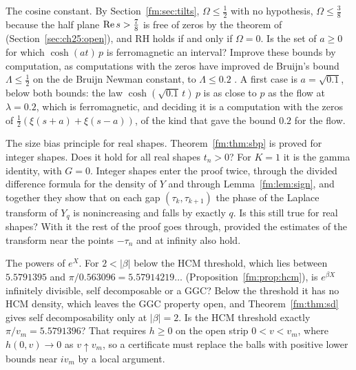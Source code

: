 \begin{problem}\label{fm:prob:omega}
The cosine constant. By Section~\ref{fm:sec:tilts}, $\Omega\le\frac12$ with no hypothesis, $\Omega\le\frac38$ because the half plane $\operatorname{Re} s>\frac78$ is free of zeros by the theorem of \cite{OAI26a} (Section~\ref{sec:ch25:open}), and RH holds if and only if $\Omega=0$. Is the set of $a\ge0$ for which $\cosh(at)\,p$ is ferromagnetic an interval? Improve these bounds by computation, as computations with the zeros have improved de Bruijn's bound $\Lambda\le\frac12$ on the de Bruijn Newman constant, to $\Lambda\le0.2$ \cite{PT21}. A first case is $a=\sqrt{0.1}$, below both bounds: the law $\cosh(\sqrt{0.1}\,t)\,p$ is as close to $p$ as the flow at $\lambda=0.2$, which is ferromagnetic, and deciding it is a computation with the zeros of $\frac12(\xi(s+a)+\xi(s-a))$, of the kind that gave the bound $0.2$ for the flow.
\end{problem}

\begin{problem}\label{fm:prob:sbp}
The size bias principle for real shapes. Theorem~\ref{fm:thm:sbp} is proved for integer shapes. Does it hold for all real shapes $t_n>0$? For $K=1$ it is the gamma identity, with $G=0$. Integer shapes enter the proof twice, through the divided difference formula for the density of $Y$ and through Lemma~\ref{fm:lem:sign}, and together they show that on each gap $(\tau_k,\tau_{k+1})$ the phase of the Laplace transform of $Y_q$ is nonincreasing and falls by exactly $q$. Is this still true for real shapes? With it the rest of the proof goes through, provided the estimates of the transform near the points $-\tau_n$ and at infinity also hold.
\end{problem}

\begin{problem}\label{fm:prob:powers}
The powers of $e^X$. For $2<|\beta|$ below the HCM threshold, which lies between $5.5791395$ and $\pi/0.563096=5.57914219\ldots$ (Proposition~\ref{fm:prop:hcm}), is $e^{\beta X}$ infinitely divisible, self decomposable or a GGC? Below the threshold it has no HCM density, which leaves the GGC property open, and Theorem~\ref{fm:thm:sd} gives self decomposability only at $|\beta|=2$. Is the HCM threshold exactly $\pi/v_m=5.5791396$? That requires $h\ge0$ on the open strip $0<v<v_m$, where $h(0,v)\to0$ as $v\uparrow v_m$, so a certificate must replace the balls with positive lower bounds near $iv_m$ by a local argument.
\end{problem}

